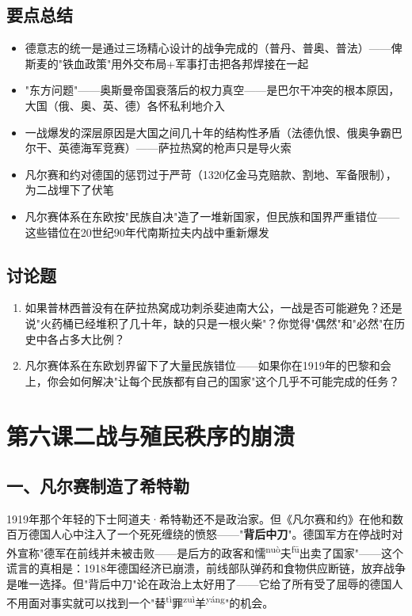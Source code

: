 \documentclass[a4paper,12pt]{ctexart}
\newcommand{\ruby}[2]{#1\textsuperscript{#2}}
\begin{document}
\subsection*{要点总结}
\begin{itemize}
  \item 德意志的统一是通过三场精心设计的战争完成的（普丹、普奥、普法）——俾斯麦的"铁血政策"用外交布局+军事打击把各邦焊接在一起
  \item "东方问题"——奥斯曼帝国衰落后的权力真空——是巴尔干冲突的根本原因，大国（俄、奥、英、德）各怀私利地介入
  \item 一战爆发的深层原因是大国之间几十年的结构性矛盾（法德仇恨、俄奥争霸巴尔干、英德海军竞赛）——萨拉热窝的枪声只是导火索
  \item 凡尔赛和约对德国的惩罚过于严苛（1320亿金马克赔款、割地、军备限制），为二战埋下了伏笔
  \item 凡尔赛体系在东欧按"民族自决"造了一堆新国家，但民族和国界严重错位——这些错位在20世纪90年代南斯拉夫内战中重新爆发
\end{itemize}

\subsection*{讨论题}
\begin{enumerate}
  \item 如果普林西普没有在萨拉热窝成功刺杀斐迪南大公，一战是否可能避免？还是说"火药桶已经堆积了几十年，缺的只是一根火柴"？你觉得"偶然"和"必然"在历史中各占多大比例？
  \item 凡尔赛体系在东欧划界留下了大量民族错位——如果你在1919年的巴黎和会上，你会如何解决"让每个民族都有自己的国家"这个几乎不可能完成的任务？
\end{enumerate}

\newpage

\section{\textcolor{orange!80!black}{第六课\quad 二战与殖民秩序的崩溃}}

\subsection*{一、凡尔赛制造了希特勒}

1919年那个年轻的下士阿道夫·希特勒还不是政治家。但《凡尔赛和约》在他和数百万德国人心中注入了一个死死缠绕的愤怒——"\textbf{背后中刀}"。德国军方在停战时对外宣称"德军在前线并未被击败——是后方的政客和\:\ruby{懦}{nuò}\ruby{夫}{fū}\:出卖了国家"——这个谎言的真相是：1918年德国经济已崩溃，前线部队弹药和食物供应断链，放弃战争是唯一选择。但"背后中刀"论在政治上太好用了——它给了所有受了屈辱的德国人不用面对事实就可以找到一个"\ruby{替}{tì}\ruby{罪}{zuì}\ruby{羊}{yáng}"的机会。
\end{document}
